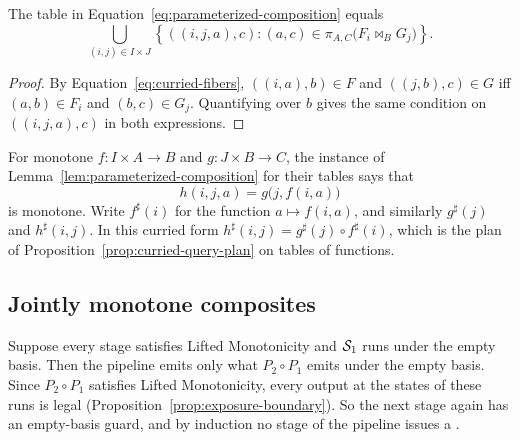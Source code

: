 \begin{proposition}
\label{prop:curried-query-plan}
The table in Equation~\ref{eq:parameterized-composition} equals
\begin{equation}
  \bigcup_{(i,j)\in I\times J}
  \left\{((i,j,a),c):
    (a,c)\in\pi_{A,C}\bigl(F_i\Join_B G_j\bigr)\right\}.
  \label{eq:curried-query-plan}
\end{equation}
\end{proposition}

\begin{proof}
By Equation~\ref{eq:curried-fibers}, $((i,a),b)\in F$ and $((j,b),c)\in G$
iff $(a,b)\in F_i$ and $(b,c)\in G_j$.  Quantifying over $b$ gives the same
condition on $((i,j,a),c)$ in both expressions.
\end{proof}

For monotone $f:I\times A\to B$ and $g:J\times B\to C$, the instance of
Lemma~\ref{lem:parameterized-composition} for their tables says that
\begin{equation}
  h(i,j,a)=g\bigl(j,f(i,a)\bigr)
  \label{eq:curried-composition}
\end{equation}
is monotone.  Write $f^\sharp(i)$ for the function $a\mapsto f(i,a)$, and
similarly $g^\sharp(j)$ and $h^\sharp(i,j)$.  In this curried form
$h^\sharp(i,j)=g^\sharp(j)\circ f^\sharp(i)$, which is the plan of
Proposition~\ref{prop:curried-query-plan} on tables of functions.

\subsection{Jointly monotone composites}

Suppose every stage satisfies Lifted Monotonicity and $\mathcal{S}_1$ runs under
the empty basis.  Then the pipeline emits only what $P_2\circ P_1$ emits under
the empty basis.  Since $P_2\circ P_1$ satisfies Lifted Monotonicity, every
output at the states of these runs is legal
(Proposition~\ref{prop:exposure-boundary}).  So the next stage again has an
empty-basis guard, and by induction no stage of the pipeline issues a
\commitment.

